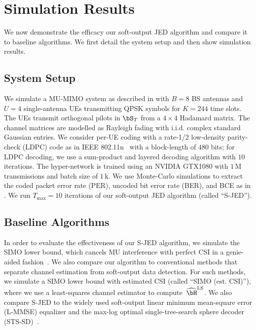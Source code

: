 \section{Simulation Results}

We now demonstrate the efficacy our soft-output JED algorithm and compare it to baseline algorithms. We first detail the system setup and then show simulation results. 

\subsection{System Setup}\label{sec:simulation setup}

We simulate a  MU-MIMO system as described in  with $B=8$ BS antennas and $U=4$ single-antenna UEs transmitting QPSK symbols for $K=244$ time slots. The UEs transmit orthogonal pilots in  $\bS_T$ from a $4\times4$ Hadamard matrix.
%
The channel matrices are modelled as Rayleigh fading with i.i.d. complex standard Gaussian entries.
%
We consider per-UE coding with a  rate-1/2 low-density parity-check (LDPC) code as in IEEE 802.11n~\cite{wlan80211nPHY} with a block-length of $480$ bits; for LDPC decoding, we use a sum-product and layered decoding algorithm with $10$ iterations.
%
The hyper-network is trained using an NVIDIA GTX1080 with $1\,$M transmissions and batch size of $1\,$k.
%
We use Monte-Carlo simulations to extract the coded packet error rate (PER), uncoded bit error rate (BER), and BCE as in .
%
We run $T_\text{max}=10$ iterations of our soft-output JED algorithm (called ``S-JED''). 



\subsection{Baseline Algorithms}
In order to evaluate the effectiveness of our S-JED algorithm, we simulate the SIMO lower bound, which cancels  MU interference with perfect CSI in a genie-aided fashion~\cite{zhang2006non}.
%
We also compare our algorithm to conventional methods that separate channel estimation from soft-output data detection. 
%
For such methods, we simulate a SIMO lower bound with estimated CSI (called ``SIMO (est. CSI)''), where we use a least-squares channel estimator to compute~$\widehat{\bH}^\text{LS}$. 
%
We also compare S-JED to the widely used soft-output linear minimum mean-square error (L-MMSE) equalizer \cite{seethalerEfficient2004,fateh2009vlsi} and the max-log optimal single-tree-search sphere decoder (STS-SD)~\cite{studer08a}.
%
